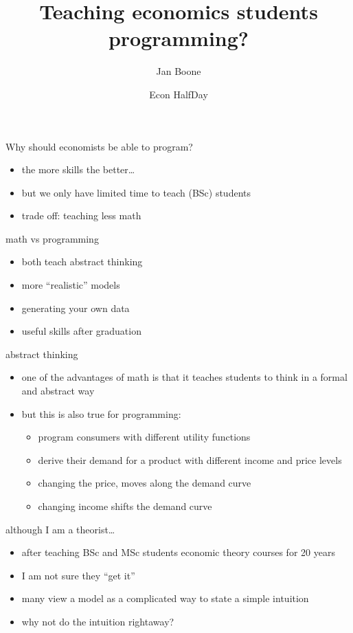 \documentclass[presentation]{beamer}
\author{Jan Boone}
\date{Econ HalfDay}
\title{Teaching economics students programming?}
\begin{document}
\maketitle

\begin{frame}[label={sec:org31c42bf}]{Why should economists be able to program?}
\begin{itemize}
\item the more skills the better\ldots{}
\item but we only have limited time to teach (BSc) students
\item trade off: teaching less math
\end{itemize}
\end{frame}


\begin{frame}[label={sec:orgbf4996a}]{math vs programming}
\begin{itemize}
\item both teach abstract thinking
\item more ``realistic'' models
\item generating your own data
\item useful skills after graduation
\end{itemize}
\end{frame}


\begin{frame}[label={sec:org31bd102}]{abstract thinking}
\begin{itemize}
\item one of the advantages of math is that it teaches students to think in a formal and abstract way
\item but this is also true for programming:
\begin{itemize}
\item program consumers with different utility functions
\item derive their demand for a product with different income and price levels
\item changing the price, moves along the demand curve
\item changing income shifts the demand curve
\end{itemize}
\end{itemize}
\end{frame}

\begin{frame}[label={sec:org26611aa}]{although I am a theorist\ldots{}}
\begin{itemize}
\item after teaching BSc and MSc students economic theory courses for 20 years
\item I am not sure they ``get it''
\item many view a model as a complicated way to state a simple intuition
\item why not do the intuition rightaway?
\end{itemize}
\end{frame}
\end{document}
